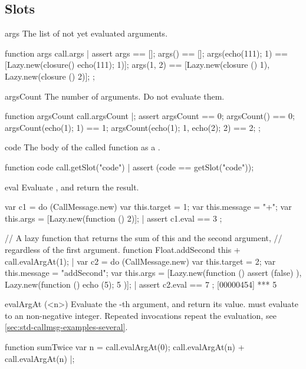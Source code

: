 \subsection{Slots}

\begin{urbiscriptapi}
\item[args]%
  The list of not yet evaluated arguments.
\begin{urbiscript}
function args { call.args }|
assert
{
  args == [];
  args() == [];
  args({echo(111); 1}) == [Lazy.new(closure() {echo(111); 1})];
  args(1, 2) == [Lazy.new(closure () {1}),
                 Lazy.new(closure () {2})];
};
\end{urbiscript}


\item[argsCount]
  The number of arguments.  Do not evaluate them.
\begin{urbiscript}
function argsCount { call.argsCount }|;
assert
{
  argsCount == 0;
  argsCount() == 0;
  argsCount({echo(1); 1}) == 1;
  argsCount({echo(1); 1}, {echo(2); 2}) == 2;
};
\end{urbiscript}

\item[code]
  The body of the called function as a .
\begin{urbiscript}
function code { call.getSlot("code") }|
assert (code == getSlot("code"));
\end{urbiscript}

\item[eval] Evaluate \this, and return the result.
\begin{urbiscript}
var c1 = do (CallMessage.new)
{
  var this.target = 1;
  var this.message = "+";
  var this.args = [Lazy.new(function () {2})];
}|
assert { c1.eval == 3 };

// A lazy function that returns the sum of this and the second argument,
// regardless of the first argument.
function Float.addSecond
{
  this + call.evalArgAt(1);
}|
var c2 = do (CallMessage.new)
{
  var this.target = 2;
  var this.message = "addSecond";
  var this.args = [Lazy.new(function (){ assert (false) }),
                   Lazy.new(function (){ echo (5); 5 })];
}|
assert { c2.eval == 7 };
[00000454] *** 5
\end{urbiscript}

\item[evalArgAt](<n>)%
  Evaluate the -th argument, and return its value.  
  must evaluate to an non-negative integer.  Repeated invocations
  repeat the evaluation, see
  \autoref{sec:std-callmsg-examples-several}.
\begin{urbiscript}
function sumTwice
{
  var n = call.evalArgAt(0);
  call.evalArgAt(n) + call.evalArgAt(n)
}|;


\end{urbiscript}
\end{urbiscriptapi}
